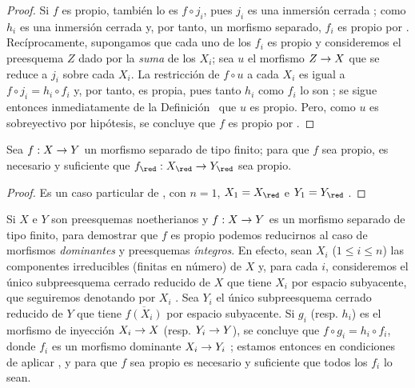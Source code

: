 \documentclass[oneside,10pt]{amsart}
\makeatletter
\renewcommand{\leq}{\leqslant}
\newcommand{\ega@arrow}[2]{\mathchoice{#1}{#2}{#2}{#2}}
\renewcommand{\to}{\ega@arrow{\longrightarrow}{\rightarrow}}
\newcommand{\oldpage}[2][]{\marginnote{\normalfont\footnotesize\textbf{#1}~|~#2}\ignorespaces}
\let\EGAOriginalLabel\label
\renewcommand{\label}[1]{\phantomsection\EGAOriginalLabel{#1}}
\makeatother
\begin{document}
\oldpage[II]{102}
\begin{proof}
Si $f$ es propio, también lo es $f\circ j_i$, pues $j_i$ es una inmersión cerrada ;
como $h_i$ es una inmersión cerrada y, por tanto, un morfismo separado, $f_i$ es propio por .
Recíprocamente, supongamos que cada uno de los $f_i$ es propio y consideremos el preesquema $Z$ dado por la \emph{suma} de los $X_i$; sea $u$ el morfismo $Z\to X$ que se reduce a $j_i$ sobre cada $X_i$.
La restricción de $f\circ u$ a cada $X_i$ es igual a $f\circ j_i=h_i\circ f_i$ y, por tanto, es propia, pues tanto $h_i$ como $f_i$ lo son ;
se sigue entonces inmediatamente de la Definición~ que $u$ es propio.
Pero, como $u$ es sobreyectivo por hipótesis, se concluye que $f$ es propio por .
\end{proof}

\begin{corollary}[5.4.6]
\label{II.5.4.6}
Sea $f:X\to Y$ un morfismo separado de tipo finito; para que $f$ sea propio, es necesario y suficiente que $f_\red:X_\red\to Y_\red$ sea propio.
\end{corollary}

\begin{proof}
Es un caso particular de , con $n=1$, $X_1=X_\red$ e $Y_1=Y_\red$ .
\end{proof}

\begin{env}[5.4.7]
\label{II.5.4.7}
Si $X$ e $Y$ son preesquemas noetherianos y $f:X\to Y$ es un morfismo separado de tipo finito, para demostrar que $f$ es propio podemos reducirnos al caso de morfismos \emph{dominantes} y preesquemas \emph{íntegros}.
En efecto, sean $X_i$ ($1\leq i\leq n$) las componentes irreducibles (finitas en número) de $X$ y, para cada $i$, consideremos el único subpreesquema cerrado reducido de $X$ que tiene $X_i$ por espacio subyacente, que seguiremos denotando por $X_i$ .
Sea $Y_i$ el único subpreesquema cerrado reducido de $Y$ que tiene $\overline{f(X_i)}$ por espacio subyacente.
Si $g_i$ (resp. $h_i$) es el morfismo de inyección $X_i\to X$ (resp. $Y_i\to Y$), se concluye que $f\circ g_i=h_i\circ f_i$, donde $f_i$ es un morfismo dominante $X_i\to Y_i$ ;
estamos entonces en condiciones de aplicar , y para que $f$ sea propio es necesario y suficiente que todos los $f_i$ lo sean.
\end{env}
\end{document}
